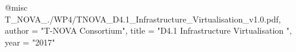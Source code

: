 @misc{ T_NOVA_./WP4/TNOVA_D4.1_Infrastructure_Virtualisation_v1.0.pdf,
       author = "{T-NOVA Consortium}",
       title = "D4.1 Infrastructure Virtualisation ",
       year = "2017" }
